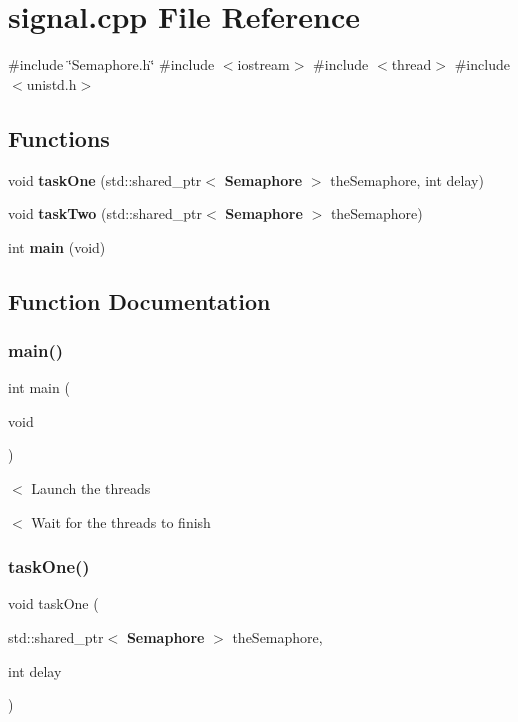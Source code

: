 \section{signal.\+cpp File Reference}
\label{signal_8cpp}
{\ttfamily \#include \char`\"{}Semaphore.\+h\char`\"{}}\newline
{\ttfamily \#include $<$iostream$>$}\newline
{\ttfamily \#include $<$thread$>$}\newline
{\ttfamily \#include $<$unistd.\+h$>$}\newline
\subsection*{Functions}
\begin{DoxyCompactItemize}
\item 
void \textbf{ task\+One} (std\+::shared\+\_\+ptr$<$ \textbf{ Semaphore} $>$ the\+Semaphore, int delay)
\item 
void \textbf{ task\+Two} (std\+::shared\+\_\+ptr$<$ \textbf{ Semaphore} $>$ the\+Semaphore)
\item 
int \textbf{ main} (void)
\end{DoxyCompactItemize}


\subsection{Function Documentation}
\mbox{\label{signal_8cpp_a840291bc02cba5474a4cb46a9b9566fe}} 
\subsubsection{main()}
{\footnotesize\ttfamily int main (\begin{DoxyParamCaption}\item[{void}]{ }\end{DoxyParamCaption})}

$<$ Launch the threads

$<$ Wait for the threads to finish \mbox{\label{signal_8cpp_a2b4729d561c345111ccab970fe11e229}} 
\subsubsection{task\+One()}
{\footnotesize\ttfamily void task\+One (\begin{DoxyParamCaption}\item[{std\+::shared\+\_\+ptr$<$ \textbf{ Semaphore} $>$}]{the\+Semaphore,  }\item[{int}]{delay }\end{DoxyParamCaption})}

